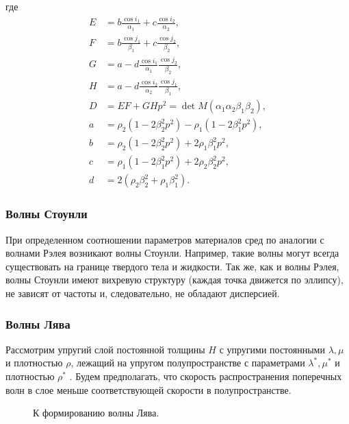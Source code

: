 где
\begin{align}
E &= b \frac{\cos{i_1}}{\alpha_1} + c \frac{\cos{i_2}}{\alpha_2}, \nonumber\\
F &= b \frac{\cos{j_1}}{\beta_1} + c \frac{\cos{j_2}}{\beta_2}, \nonumber\\
G &= a - d \frac{\cos{i_1}}{\alpha_1} \frac{\cos{j_2}}{\beta_2}, \nonumber\\
H &= a - d \frac{\cos{i_2}}{\alpha_2} \frac{\cos{j_1}}{\beta_1}, \nonumber\\
D &= EF + GHp^2 = \det{M}(\alpha_1 \alpha_2 \beta_1 \beta_2), \nonumber\\
a &= \rho_2 (1 - 2 \beta_2^2 p^2) - \rho_1 (1 - 2 \beta_1^2 p^2), \nonumber\\
b &= \rho_2 (1 - 2 \beta_2^2 p^2) + 2 \rho_1 \beta_1^2 p^2, \nonumber\\
c &= \rho_1 (1 - 2 \beta_1^2 p^2) + 2 \rho_2 \beta_2^2 p^2, \nonumber\\
d &= 2 (\rho_2 \beta_2^2 + \rho_1 \beta_1^2).
\end{align}


\subsubsection{Волны Стоунли}

При определенном соотношении параметров материалов сред по аналогии с волнами Рэлея возникают волны Стоунли. Например, такие волны могут всегда существовать на границе твердого тела и жидкости. Так же, как и волны Рэлея, волны Стоунли имеют вихревую структуру (каждая точка движется по эллипсу), не зависят от частоты и, следовательно, не обладают дисперсией. 


\subsubsection{Волны Лява}

Рассмотрим упругий слой постоянной толщины $H$ с упругими постоянными $\lambda, \mu$ и плотностью $\rho$, лежащий на упругом полупространстве с параметрами $\lambda^*, \mu^*$ и плотностью $\rho^*$ \cite{amenadze}. Будем предполагать, что скорость распространения поперечных волн в слое меньше соответствующей скорости в полупространстве. 

\begin{figure}[h]
\caption{К формированию волны Лява.}
\end{figure}

